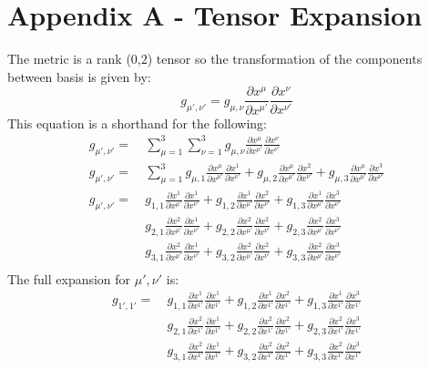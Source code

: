 \documentclass[a4paper]{article}
\begin{document}
\section{Appendix A - Tensor Expansion}
  The metric is a rank ($0$,$2$) tensor so the transformation of the components
  between basis is given by:
  \[
      g_{\mu', \nu'} = g_{\mu, \nu} \frac{\partial x^\mu}{\partial x^{\mu'}}\frac{\partial x^\nu}{\partial x^{\nu'}}
  \]
  This equation is a shorthand for the following:
    \[
    \begin{align*}
    g_{\mu', \nu'} =&\ \sum_{\mu=1}^{3} \sum_{\nu=1}^{3} g_{\mu, \nu} \frac{\partial x^\mu}{\partial x^{\mu'}}
    \frac{\partial x^\nu}{\partial x^{\nu'}} \\
    g_{\mu', \nu'} =&\ \sum_{\mu=1}^{3}
     g_{\mu, 1}\frac{\partial x^\mu}{\partial x^{\mu'}}\frac{\partial x^1}{\partial x^{\nu'}}
    +g_{\mu, 2}\frac{\partial x^\mu}{\partial x^{\mu'}}\frac{\partial x^2}{\partial x^{\nu'}}
    +g_{\mu, 3}\frac{\partial x^\mu}{\partial x^{\mu'}} \frac{\partial x^3}{\partial x^{\nu'}}\\
    g_{\mu', \nu'} =&\
     g_{1,1}\frac{\partial x^1}{\partial x^{\mu'}}\frac{\partial x^1}{\partial x^{\nu'}}
    +g_{1,2}\frac{\partial x^1}{\partial x^{\mu'}}\frac{\partial x^2}{\partial x^{\nu'}}
    +g_{1,3}\frac{\partial x^1}{\partial x^{\mu'}}\frac{\partial x^3}{\partial x^{\nu'}}\\
    &\ g_{2,1}\frac{\partial x^2}{\partial x^{\mu'}}\frac{\partial x^1}{\partial x^{\nu'}}
    +g_{2,2}\frac{\partial x^2}{\partial x^{\mu'}}\frac{\partial x^2}{\partial x^{\nu'}}
    +g_{2,3}\frac{\partial x^2}{\partial x^{\mu'}}\frac{\partial x^3}{\partial x^{\nu'}}\\
    &\
     g_{3,1}\frac{\partial x^2}{\partial x^{\mu'}}\frac{\partial x^1}{\partial x^{\nu'}}
    +g_{3,2}\frac{\partial x^2}{\partial x^{\mu'}}\frac{\partial x^2}{\partial x^{\nu'}}
    +g_{3,3}\frac{\partial x^2}{\partial x^{\mu'}}\frac{\partial x^3}{\partial x^{\nu'}}\\
    \end{align*}
  \]
  The full expansion for $\mu', \nu'$ is:
  \[
    \begin{align*}
    g_{1', 1'} =\
     &g_{1,1}\frac{\partial x^1}{\partial x^{1'}}\frac{\partial x^1}{\partial x^{1'}}
    +g_{1,2}\frac{\partial x^1}{\partial x^{1'}}\frac{\partial x^2}{\partial x^{1'}}
    +g_{1,3}\frac{\partial x^1}{\partial x^{1'}}\frac{\partial x^3}{\partial x^{1'}}\\
    &
     g_{2,1}\frac{\partial x^2}{\partial x^{1'}}\frac{\partial x^1}{\partial x^{1'}}
    +g_{2,2}\frac{\partial x^2}{\partial x^{1'}}\frac{\partial x^2}{\partial x^{1'}}
    +g_{2,3}\frac{\partial x^2}{\partial x^{1'}}\frac{\partial x^3}{\partial x^{1'}}\\
    &
     g_{3,1}\frac{\partial x^2}{\partial x^{1'}}\frac{\partial x^1}{\partial x^{1'}}
    +g_{3,2}\frac{\partial x^2}{\partial x^{1'}}\frac{\partial x^2}{\partial x^{1'}}
    +g_{3,3}\frac{\partial x^2}{\partial x^{1'}}\frac{\partial x^3}{\partial x^{1'}}\\
    \end{align*}
  \]
\end{document}
